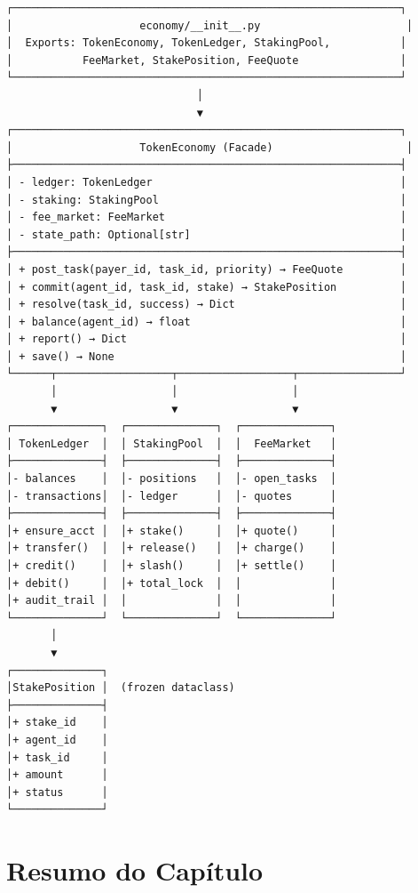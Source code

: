 \begin{verbatim}
┌─────────────────────────────────────────────────────────────┐
│                    economy/__init__.py                       │
│  Exports: TokenEconomy, TokenLedger, StakingPool,           │
│           FeeMarket, StakePosition, FeeQuote                │
└─────────────────────────────────────────────────────────────┘
                              │
                              ▼
┌─────────────────────────────────────────────────────────────┐
│                    TokenEconomy (Facade)                     │
├─────────────────────────────────────────────────────────────┤
│ - ledger: TokenLedger                                       │
│ - staking: StakingPool                                      │
│ - fee_market: FeeMarket                                     │
│ - state_path: Optional[str]                                 │
├─────────────────────────────────────────────────────────────┤
│ + post_task(payer_id, task_id, priority) → FeeQuote         │
│ + commit(agent_id, task_id, stake) → StakePosition          │
│ + resolve(task_id, success) → Dict                          │
│ + balance(agent_id) → float                                 │
│ + report() → Dict                                           │
│ + save() → None                                             │
└──────┬──────────────────┬──────────────────┬────────────────┘
       │                  │                  │
       ▼                  ▼                  ▼
┌──────────────┐  ┌──────────────┐  ┌──────────────┐
│ TokenLedger  │  │ StakingPool  │  │  FeeMarket   │
├──────────────┤  ├──────────────┤  ├──────────────┤
│- balances    │  │- positions   │  │- open_tasks  │
│- transactions│  │- ledger      │  │- quotes      │
├──────────────┤  ├──────────────┤  ├──────────────┤
│+ ensure_acct │  │+ stake()     │  │+ quote()     │
│+ transfer()  │  │+ release()   │  │+ charge()    │
│+ credit()    │  │+ slash()     │  │+ settle()    │
│+ debit()     │  │+ total_lock  │  │              │
│+ audit_trail │  │              │  │              │
└──────────────┘  └──────────────┘  └──────────────┘
       │
       ▼
┌──────────────┐
│StakePosition │  (frozen dataclass)
├──────────────┤
│+ stake_id    │
│+ agent_id    │
│+ task_id     │
│+ amount      │
│+ status      │
└──────────────┘
\end{verbatim}

\section*{Resumo do Capítulo}

